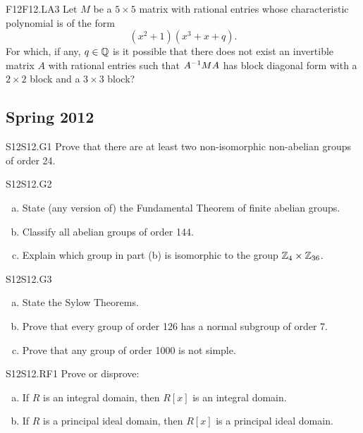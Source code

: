 \documentclass[../AlgebraQualSolutions.tex]{subfiles}
\begin{document}
	\begin{prob}{F12}{F12.LA3}
	Let $M$ be a $5 \times 5$ matrix with rational entries whose characteristic polynomial is of the form
		\[(x^2+1)(x^3+x+q).\]
	For which, if any, $q \in \mathbb{Q}$ is it possible that there does not exist an invertible matrix $A$ with rational entries such that $A^{-1} M A$ has block diagonal form with a $2 \times 2$ block and a $3 \times 3$ block?
	\end{prob}
	
	\subsection{Spring 2012}


	\begin{prob}{S12}{S12.G1}
		Prove that there are at least two non-isomorphic non-abelian groups of order 24.
	\end{prob}

	\begin{prob}{S12}{S12.G2}
		\begin{enumerate}[(a)]
			\item State (any version of) the Fundamental Theorem of finite abelian groups.
			\item Classify all abelian groups of order 144.
			\item Explain which group in part (b) is isomorphic to the group $\mathbb{Z}_4 \times \mathbb{Z}_{36}$.
		\end{enumerate}
	\end{prob}

	\begin{prob}{S12}{S12.G3}
		\begin{enumerate}[(a)]
			\item State the Sylow Theorems.
			\item Prove that every group of order 126 has a normal subgroup of order 7.
			\item Prove that any group of order 1000 is not simple.
		\end{enumerate}
	\end{prob}

	\begin{prob}{S12}{S12.RF1}
		Prove or disprove:

		\begin{enumerate}[(a)]
			\item If $R$ is an integral domain, then $R[x]$ is an integral domain.
			\item If $R$ is a principal ideal domain, then $R[x]$ is a principal ideal domain.
		\end{enumerate}
	\end{prob}
\end{document}
